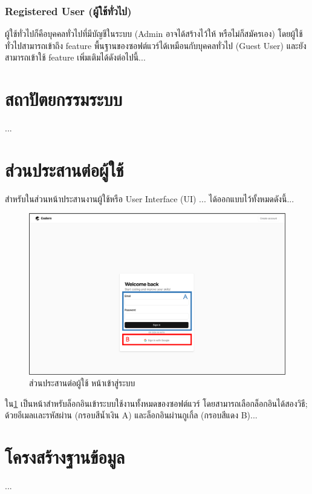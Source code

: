 \documentclass[12pt,one side,openright,a4paper]{cpe-thesis-th}
\newcommand{\thaijustify}[1]{%
  \par\hspace{30pt}\justifying
  #1
}
\begin{document}
        \subsubsection{Registered User (ผู้ใช้ทั่วไป)}
            \thaijustify{
                ผู้ใช้ทั่วไปก็คือบุคคลทั่วไปที่มีบัญชีในระบบ (Admin อาจได้สร้างไว้ให้ หรือไม่ก็สมัครเอง) โดยผู้ใช้ทั่วไปสามารถเข้าถึง feature พื้นฐานของซอฟต์แวร์ได้เหมือนกับบุคคลทั่วไป (Guest User) และยังสามารถเข้าใช้ feature เพิ่มเติมได้ดังต่อไปนี้...
            }
    \pagebreak
\section{สถาปัตยกรรมระบบ}
    \thaijustify{
        ...
    }
    \pagebreak
\section{ส่วนประสานต่อผู้ใช้}
    \thaijustify{
        สำหรับในส่วนหน้าประสานงานผู้ใช้หรือ User Interface (UI) ... ได้ออกแบบไว้ทั้งหมดดังนี้...
    }
    \begin{figure}[H]
    \centering
        \includegraphics[width=15cm]{figure/ui/ui-login1.png}
        \caption[ส่วนประสานต่อผู้ใช้ หน้าเข้าสู่ระบบ]{ส่วนประสานต่อผู้ใช้ หน้าเข้าสู่ระบบ}
        \label{fig:ui-login}
    \end{figure}
    \thaijustify{
        ใน\cref{fig:ui-login} เป็นหน้าสำหรับล็อกอินเข้าระบบใช้งานทั้งหมดของซอฟต์แวร์ โดยสามารถเลือกล็อกอินได้สองวิธี; ด้วยอีเมลเเละรหัสผ่าน (กรอบสีน้ำเงิน A) และล็อกอินผ่านกูเกิ้ล (กรอบสีแดง B)...
    }  
\pagebreak
\section{โครงสร้างฐานข้อมูล}
    \thaijustify{
       ...
    }
    \pagebreak
\end{document}
